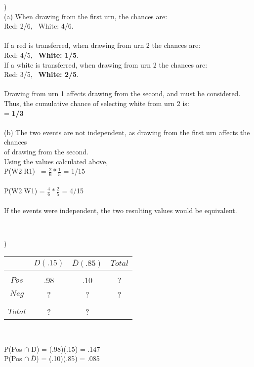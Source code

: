 \documentclass[12pt]{article}
\begin{document}
)\\
\indent (a) When drawing from the first urn, the chances are:\\
\indent \indent Red: 2/6, \ White: 4/6.\\\\
\indent \indent If a red is transferred, when drawing from urn 2 the chances are: \\
\indent \indent Red: 4/5, \ \textbf{White: 1/5}.\\
\indent \indent If a white is transferred, when drawing from urn 2 the chances are: \\
\indent \indent Red: 3/5, \ \textbf{White: 2/5}.\\\\
\indent \indent Drawing from urn 1 affects drawing from the second, and must be considered.\\
\indent \indent Thus, the cumulative chance of selecting white from urn 2 is:\\ 
\indent {} = \textbf{1/3}\\\\

\indent (b) The two events are not independent, as drawing from the first urn affects the chances\\
\indent \indent  of drawing from the second.\\
\indent \indent Using the values calculated above, \\
\indent \indent P(W2$|$R1) \ = {\Large$ \frac{2}{6}*\frac{1}{5}$} = 1/15\\\\
\indent \indent P(W2$|$W1) = {\Large$ \frac{4}{6}*\frac{2}{5}$} = 4/15\\\\
\indent \indent If the events were independent, the two resulting values would be equivalent.


\noindent \hrulefill \\

\begin{multicols}{2}
)
\begin{tabular}{c|cc|c}
 & $D(.15)$ & $\overline{D}(.85)$ & $Total$ \\
 \hline &&&\\[-1em]
$Pos$ & .98 & .10 & ?\\
$Neg$ & ? & ? & ?\\
 \hline &&&\\[-1em]
 $Total$ & ? & ? & 
\end{tabular}\\

\columnbreak 

\hfill \break
\noindent P(Pos $\cap$ D) = (.98)(.15) = .147\\
P(Pos $\cap \ \overline{D}$) = (.10)(.85) = .085\\

\end{multicols}
\end{document}
